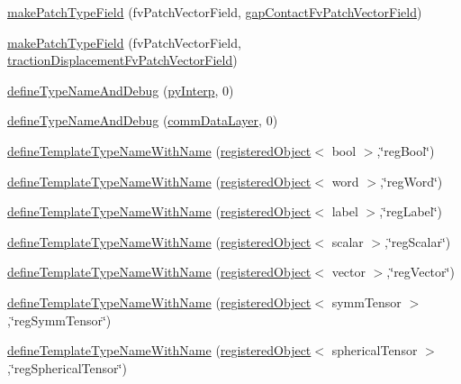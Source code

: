 \begin{DoxyCompactItemize}
\hyperlink{namespaceFoam_a8c06a28eb97f5e5b64a8c6a2b7c22ad4}{make\+Patch\+Type\+Field} (fv\+Patch\+Vector\+Field, \hyperlink{classFoam_1_1gapContactFvPatchVectorField}{gap\+Contact\+Fv\+Patch\+Vector\+Field})
\item 
\hyperlink{namespaceFoam_a5c6e58e7e59e421d7406e5bded0843ac}{make\+Patch\+Type\+Field} (fv\+Patch\+Vector\+Field, \hyperlink{classFoam_1_1tractionDisplacementFvPatchVectorField}{traction\+Displacement\+Fv\+Patch\+Vector\+Field})
\item 
\hyperlink{namespaceFoam_ad01923059b59c983334f8b78cbd710f5}{define\+Type\+Name\+And\+Debug} (\hyperlink{classFoam_1_1pyInterp}{py\+Interp}, 0)
\item 
\hyperlink{namespaceFoam_a601fbaf8a74420a30179d4a447455b9c}{define\+Type\+Name\+And\+Debug} (\hyperlink{classFoam_1_1commDataLayer}{comm\+Data\+Layer}, 0)
\item 
\hyperlink{namespaceFoam_ab79d10bbf7924f944e22abcf9c1c1345}{define\+Template\+Type\+Name\+With\+Name} (\hyperlink{classFoam_1_1registeredObject}{registered\+Object}$<$ bool $>$,\char`\"{}reg\+Bool\char`\"{})
\item 
\hyperlink{namespaceFoam_ae1332b21fc83374fca065787dc7ca72c}{define\+Template\+Type\+Name\+With\+Name} (\hyperlink{classFoam_1_1registeredObject}{registered\+Object}$<$ word $>$,\char`\"{}reg\+Word\char`\"{})
\item 
\hyperlink{namespaceFoam_ae1105e5c7c72c6a06cfd5725ad18e789}{define\+Template\+Type\+Name\+With\+Name} (\hyperlink{classFoam_1_1registeredObject}{registered\+Object}$<$ label $>$,\char`\"{}reg\+Label\char`\"{})
\item 
\hyperlink{namespaceFoam_a8a0acabced698824d8b0c35114c7b17a}{define\+Template\+Type\+Name\+With\+Name} (\hyperlink{classFoam_1_1registeredObject}{registered\+Object}$<$ scalar $>$,\char`\"{}reg\+Scalar\char`\"{})
\item 
\hyperlink{namespaceFoam_af436d575d2f607de7b422ed3af6fcce9}{define\+Template\+Type\+Name\+With\+Name} (\hyperlink{classFoam_1_1registeredObject}{registered\+Object}$<$ vector $>$,\char`\"{}reg\+Vector\char`\"{})
\item 
\hyperlink{namespaceFoam_a3a08b222616bcea3e311f1e914545cd0}{define\+Template\+Type\+Name\+With\+Name} (\hyperlink{classFoam_1_1registeredObject}{registered\+Object}$<$ symm\+Tensor $>$,\char`\"{}reg\+Symm\+Tensor\char`\"{})
\item 
\hyperlink{namespaceFoam_ab006775e61e5862607151736454c42de}{define\+Template\+Type\+Name\+With\+Name} (\hyperlink{classFoam_1_1registeredObject}{registered\+Object}$<$ spherical\+Tensor $>$,\char`\"{}reg\+Spherical\+Tensor\char`\"{})

\end{DoxyCompactItemize}

